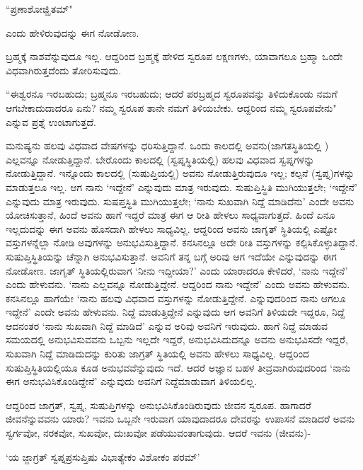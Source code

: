 \begin{shloka}
``ಪ್ರಣಾಶೋಜ್ಝಿತಮ್"
\end{shloka}

ಎಂದು ಹೇಳಿರುವುದನ್ನು ಈಗ ನೋಡೋಣ.

ಬ್ರಹ್ಮಕ್ಕೆ ನಾಶವೆನ್ನುವುದೂ ಇಲ್ಲ. ಆದ್ದರಿಂದ ಬ್ರಹ್ಮಕ್ಕೆ ಹೇಳಿದ ಸ್ವರೂಪ ಲಕ್ಷಣಗಳು, ಯಾವಾಗಲೂ ಬ್ರಹ್ಮಾ ಒಂದೇ ವಿಧವಾಗಿರುತ್ತದೆಂದು ತೋರಿಸುವುದು. 

``ಈಶ್ವರನೂ ಇರಬಹುದು; ಬ್ರಹ್ಮನೂ ಇರಬಹುದು; ಆದರೆ  ಪರಬ್ರಹ್ಮದ ಸ್ವರೂಪವನ್ನು ತಿಳಿದುಕೊಂಡು ನಮಗೆ ಆಗಬೇಕಾದುದಾದರೂ ಏನು? ನಮ್ಮ ಸ್ವರೂಪ ತಾನೇ ನಮಗೆ ತಿಳಿಯಬೇಕು. ಆದ್ದರಿಂದ ನಮ್ಮ ಸ್ವರೂಪವೇನು" ಎನ್ನುವ ಪ್ರಶ್ನೆ ಉಂಟಾಗುತ್ತದೆ. 

ಮನುಷ್ಯನು ಹಲವು ವಿಧವಾದ ವೇಷಗಳನ್ನು ಧರಿಸುತ್ತಿದ್ದಾನೆ. ಒಂದು ಕಾಲದಲ್ಲಿ  ಅವನು(ಜಾಗತಸ್ಥಿತಿಯಲ್ಲಿ ) ಎಲ್ಲವನ್ನೂ ನೋಡುತ್ತಿದ್ದಾನೆ. ಬೇರೊಂದು ಕಾಲದಲ್ಲಿ (ಸ್ವಪ್ನಸ್ಥಿತಿಯಲ್ಲಿ) ಹಲವು ವಿಧವಾದ ಸ್ವಪ್ನಗಳನ್ನು ನೋಡುತ್ತಿದ್ದಾನೆ. ಇನ್ನೊಂದು ಕಾಲದಲ್ಲಿ (ಸುಷುಪ್ತಿಯಲ್ಲಿ) ಅವನು ನೋಡುತ್ತಿರುವುದೂ ಇಲ್ಲ; ಕಲ್ಪನೆ (ಸ್ವಪ್ನ)ಗಳನ್ನು  ಮಾಡುತ್ತಲೂ ಇಲ್ಲ. ಆಗ ನಾನು `ಇದ್ದೇನೆ' ಎನ್ನುವುದು ಮಾತ್ರ ಇರುವುದು. ಸುಷುಪ್ತಿಸ್ಥಿತಿ ಮುಗಿಯುತ್ತಲೇ; `ಇದ್ದೇನೆ' ಎನ್ನುವುದು ಮಾತ್ರ ಇರುವುದು. ಸುಷಪ್ತಸ್ಥಿತಿ ಮುಗಿಯುತ್ತಲೇ; `ನಾನು ಸುಖವಾಗಿ ನಿದ್ದೆ ಮಾಡಿದೆನು' ಎಂದೇ ಅವನು  ಯೋಚಿಸುತ್ತಾನೆ, ಹಿಂದೆ ಅವನು ಹಾಗೆ ಇದ್ದರೆ ಮಾತ್ರ ಈಗ ಆ ರೀತಿ ಹೇಳಲು ಸಾಧ್ಯವಾಗುತ್ತದೆ. ಹಿಂದೆ ಏನೂ ಇಲ್ಲದುದನ್ನು ಈಗ ಅವನು ಹೊಸದಾಗಿ ಹೇಳಲು ಸಾಧ್ಯವಿಲ್ಲ. ಆದ್ದರಿಂದ ಅವನು ಜಾಗೃತ್ ಸ್ಥಿತಿಯಲ್ಲಿ ಎಷ್ಟೋ ವಸ್ತುಗಳನ್ನೆಲ್ಲಾ ನೋಡಿ ಅವುಗಳನ್ನು ಅನುಭವಿಸುತ್ತಿದ್ದಾನೆ. ಕನಸಿನಲ್ಲೂ ಅದೇ ರೀತಿ ವಸ್ತುಗಳನ್ನು ಕಲ್ಪಿಸಿಕೊಳ್ಳುತಿದ್ದಾನೆ. ಸುಷುಪ್ತಿಸ್ಥಿತಿಯನ್ನು ಚೆನ್ನಾಗಿ ಅನುಭವಿಸುತ್ತಾನೆ. ಅವನಿಗೆ ತನ್ನ ಬಗ್ಗೆ ಅರಿವು ಆಗ ಇದೆಯೇ ಎನ್ನುವುದನ್ನು ಈಗ ನೋಡೋಣ. ಜಾಗೃತ್ ಸ್ಥಿತಿಯಲ್ಲಿರುವಾಗ `ನೀನು ಇದ್ದೀಯಾ?' ಎಂದು ಯಾರಾದರೂ ಕೇಳಿದರೆ, `ನಾನು ಇದ್ದೇನೆ' ಎಂದು ಹೇಳುವನು. `ನಾನು ಎಲ್ಲವನ್ನೂ ನೋಡುತ್ತಿದ್ದೇನೆ. ಆದ್ದರಿಂದ ನಾನು ಇದ್ದೇನೆ' ಎಂದು ಅವನು ಹೇಳುವನು. ಕನಸಿನಲ್ಲೂ ಹಾಗೆಯೇ `ನಾನು ಹಲವು ವಿಧವಾದ ವಸ್ತುಗಳನ್ನು ನೋಡುತ್ತಿದ್ದೇನೆ. ಎನ್ನುವುದರಿಂದ ನಾನು ಆಗಲೂ ಇದ್ದೇನೆ' ಎಂದೇ ಅವನು ಹೇಳುವನು. ನಿದ್ದೆ ಮಾಡುತ್ತಿದ್ದೇನೆ ಎನ್ನುವುದು ಆಗ ಅವನಿಗೆ ತಿಳಿಯದೇ ಇದ್ದರೂ, ನಿದ್ದೆ ಆದನಂತರ `ನಾನು ಸುಖವಾಗಿ ನಿದ್ದೆ ಮಾಡಿದೆ' ಎನ್ನುವ ಅರಿವು ಅವನಿಗೆ ಇರುವುದು. ಹಾಗೆ ನಿದ್ದೆ ಮಾಡುವ ಸಮಯದಲ್ಲಿ ಅನುಭವಿಸುವವನು ಒಬ್ಬನು ಇಲ್ಲದೇ ಇದ್ದರೆ, ಅನುಭವಿಸಿದುದನ್ನೂ ಅವನು ಅನುಭವಿಸದೇ ಇದ್ದರೆ, ಸುಖವಾಗಿ ನಿದ್ದೆ ಮಾಡಿದುದನ್ನು ಕುರಿತು ಜಾಗ್ರತ್ ಸ್ಥಿತಿಯಲ್ಲಿ ಅವನು ಹೇಳಲು ಸಾಧ್ಯವಿಲ್ಲ. ಆದ್ದರಿಂದ ಸುಷುಪ್ತಿಸ್ಥಿತಿಯಲ್ಲಿಯೂ ಕೂಡ ಅನುಭವವೆನ್ನುವುದು ಇದೆ. ಆದರೆ ಅಜ್ಞಾನ ಬಹಳ ತೀವ್ರವಾಗಿರುವುದರಿಂದ `ನಾನು ಈಗ ಅನುಭವಿಸಿಕೊಂಡಿದ್ದೇನೆ' ಎನ್ನುವುದು ಅವನಿಗೆ ನಿದ್ದೆಮಾಡುವಾಗ ತಿಳಿಯಲಿಲ್ಲ.

ಆದ್ದರಿಂದ ಜಾಗ್ರತ್, ಸ್ವಪ್ನ, ಸುಷುಪ್ತಿಗಳನ್ನು ಅನುಭವಿಸಿಕೊಂಡಿರುವುದು ಜೀವನ ಸ್ವರೂಪ. ಹಾಗಾದರೆ ಜೀವನೆನ್ನುವವನು ಯಾರು? ಇವನು ಒಬ್ಬನೇ ಇರುವಾಗ ಯಾವುದಾದರೂ ದೇವರನ್ನು ಉಪಾಸನೆ ಮಾಡಿದರೆ ಅವನು ಸ್ವರ್ಗವೋ, ನರಕವೋ, ಸುಖವೋ, ದುಃಖವೋ ಪಡೆಯುವಂತಾಗುವುದು. ಆದರೆ ಇವನು (ಜೀವನು)-

\begin{shloka}
`ಯ ಜ್ಜಾಗ್ರತ್ ಸ್ವಪ್ನಪ್ರಸುಪ್ತಿಷು ವಿಭಾತ್ಯೇಕಂ ವಿಶೋಕಂ ಪರಮ್'
\end{shloka}


